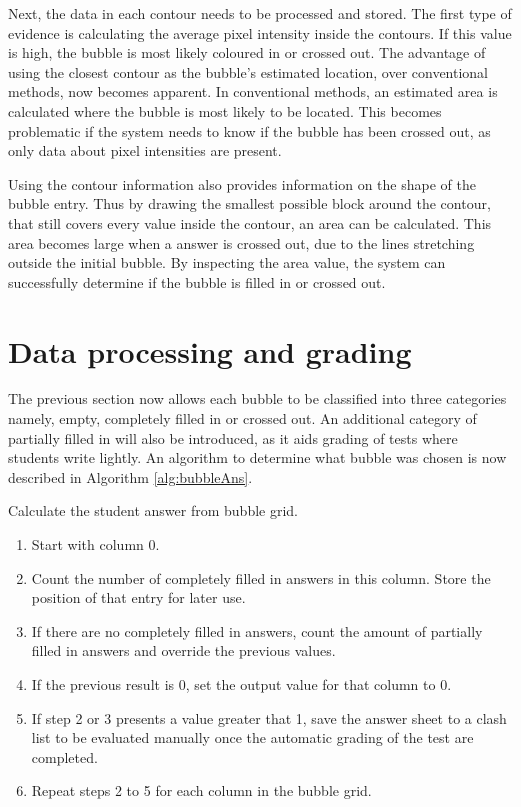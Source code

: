 Next, the data in each contour needs to be processed and stored. The first type of evidence is calculating the average pixel intensity inside the contours. If this value is high, the bubble is most likely coloured in or crossed out. The advantage of using the closest contour as the bubble's estimated location, over conventional methods, now becomes apparent. In conventional methods, an estimated area is calculated where the bubble is most likely to be located. This becomes problematic if the system needs to know if the bubble has been crossed out, as only data about pixel intensities are present. 

Using the contour information also provides information on the shape of the bubble entry. Thus by drawing the smallest possible block around the contour, that still covers every value inside the contour, an area can be calculated. This area becomes large when a answer is crossed out, due to the lines stretching outside the initial bubble. By inspecting the area value, the system can successfully determine if the bubble is filled in or crossed out.

\section{Data processing and grading}

The previous section now allows each bubble to be classified into three categories namely, empty, completely filled in or crossed out. An additional category of partially filled in will also be introduced, as it aids grading of tests where students write lightly. An algorithm to determine what bubble was chosen is now described in Algorithm \ref{alg:bubbleAns}.

\begin{algorithm}[H]
\caption{Calculate the student answer from bubble grid.}
\label{alg:bubbleAns}
\begin{enumerate}
\item Start with column 0.
\item Count the number of completely filled in answers in this column. Store the position of that entry for later use.
\item If there are no completely filled in answers, count the amount of partially filled in answers and override the previous values.
\item If the previous result is 0, set the output value for that column to 0.
\item If step 2 or 3 presents a value greater that 1, save the answer sheet to a clash list to be evaluated manually once the automatic grading of the test are completed.
\item Repeat steps 2 to 5 for each column in the bubble grid.
\end{enumerate}
\end{algorithm}



